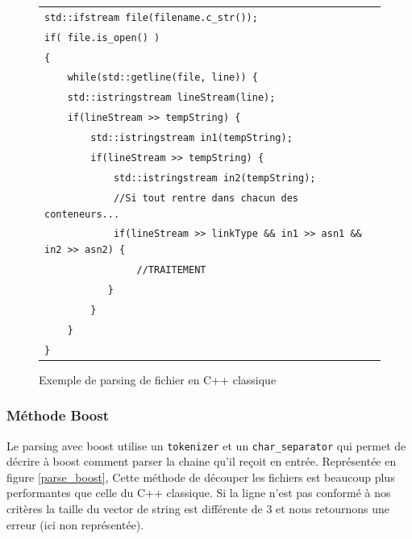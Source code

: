 \begin{figure}[H]
   \begin{center}
      \begin{tabular}{l}
        \hline 
        \verb|std::ifstream file(filename.c_str());|\\
	\verb|if( file.is_open() )|\\
	\verb|{|\\
   	\verb|    while(std::getline(file, line)) {|\\
      	\verb|    std::istringstream lineStream(line);|\\
      	\verb|    if(lineStream >> tempString) {|\\
        \verb|        std::istringstream in1(tempString);|\\
        \verb|        if(lineStream >> tempString) {|\\
        \verb|            std::istringstream in2(tempString);|\\
        \verb|            //Si tout rentre dans chacun des conteneurs...|\\
        \verb|            if(lineStream >> linkType && in1 >> asn1 && in2 >> asn2) {|\\
        \verb|                //TRAITEMENT|\\
        \verb|           }|\\
        \verb|        }|\\
        \verb|    }|\\
        \verb|}|\\
        \hline
      \end{tabular}
   \end{center}
\caption{\label{parse_cpp} Exemple de parsing de fichier en C++ classique}
\end{figure}




\subsubsection{Méthode Boost}
Le parsing avec boost utilise un \verb|tokenizer| et un \verb|char_separator| qui permet de décrire à boost comment parser la chaine qu'il reçoit en entrée. Représentée en figure \ref{parse_boost}, Cette méthode de découper les fichiers est beaucoup plus performantes que celle du C++ classique. Si la ligne n'est pas conformé à nos critères la taille du vector de string est différente de 3 et nous retournons une erreur (ici non représentée). 

